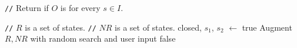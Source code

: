 \newcommand{\algocomment}[1]{\State \textcolor{flatdenim}{\texttt{//} #1}}
\begin{algorithm}[t]
  \caption{%
    Interactive \invariantconfluence{} decision procedure for arbitrary start
    state $s \in I$
  }%
  \begin{algorithmic}
    \algocomment{Return if $O$ is  for every $s \in I$.}
      \State \Return {}
    \EndFunction

    \State

    \algocomment{$R$ is a set of \TIcoreachable{} states.}
    \algocomment{$NR$ is a set of \TIcounreachable{} states.}
      \State closed, $s_1$, $s_2$ $\gets$ 
        \Return true
      \EndIf
      \State Augment $R, NR$ with random search and user input
        \Return false
      \EndIf
      \State \Return {}
    \EndFunction
  \end{algorithmic}
\end{algorithm}

